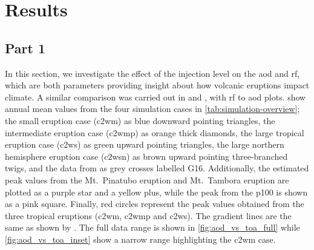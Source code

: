\documentclass{ametsocV5}
\begin{document}
\section{Results}


\subsection{Part 1}

In this section, we investigate the effect of the  injection level on the
\ac{aod} and \ac{rf}, which are both parameters providing insight about how volcanic
eruptions impact climate. A similar comparison was carried out in \citet[][their Fig.\
  4]{gregory2016} and \citet[][their Fig.\ 1]{marshall2020}, with \ac{rf} to \ac{aod}
plots. \Cref{fig:aod_vs_toa_ses_avg} show annual mean values from the four simulation
cases in \cref{tab:simulation-overview}; the small eruption case (\ac{c2wm}) as blue
downward pointing triangles, the intermediate eruption case (\ac{c2wmp}) as orange thick
diamonds, the large tropical eruption case (\ac{c2ws}) as green upward pointing
triangles, the large northern hemisphere eruption case (\ac{c2wsn}) as brown upward
pointing three-branched twigs, and the data from \citet[][Fig.\ 4, black crosses from
  HadCM3 sstPiHistVol]{gregory2016} as grey crosses labelled G16. Additionally, the
estimated peak values from the Mt.\ Pinatubo eruption and Mt.\ Tambora eruption are
plotted as a purple star and a yellow plus, while the peak from the \ac{p100} is shown
as a pink square. Finally, red circles represent the peak values obtained from the three
tropical eruptions (\ac{c2wm}, \ac{c2wmp} and \ac{c2ws}). The gradient lines are the
same as shown by \citet{gregory2016}. The full data range is shown in
\cref{fig:aod_vs_toa_full} while \cref{fig:aod_vs_toa_inset} show a narrow range
highlighting the \ac{c2wm} case.
\end{document}
